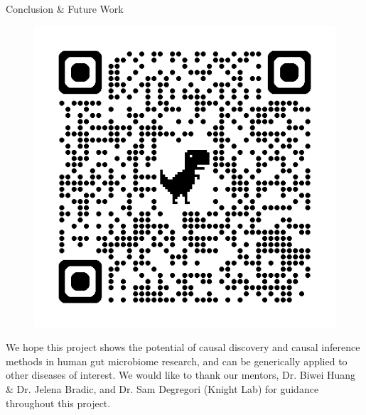 \documentclass[final]{beamer}
\begin{document}
\begin{frame}[t]
\begin{columns}[t]
\begin{column}{0.65\textwidth}
\begin{columns}[t]
\begin{column}{0.5\textwidth}
\begin{block}{Conclusion \& Future Work}
        \begin{figure}
                \centering
                \includegraphics[width=\linewidth]{website_qr.png}
        \end{figure} We hope this project shows the potential of causal discovery and causal inference methods in human gut microbiome research, and can be generically applied to other diseases of interest. We would like to thank our mentors, Dr. Biwei Huang \& Dr. Jelena Bradic,  and Dr. Sam Degregori (Knight Lab) for guidance throughout this project.
          
      \end{block}

    \end{column}
  \end{columns}

\end{column}

\end{columns}
\end{frame}
\end{document}
